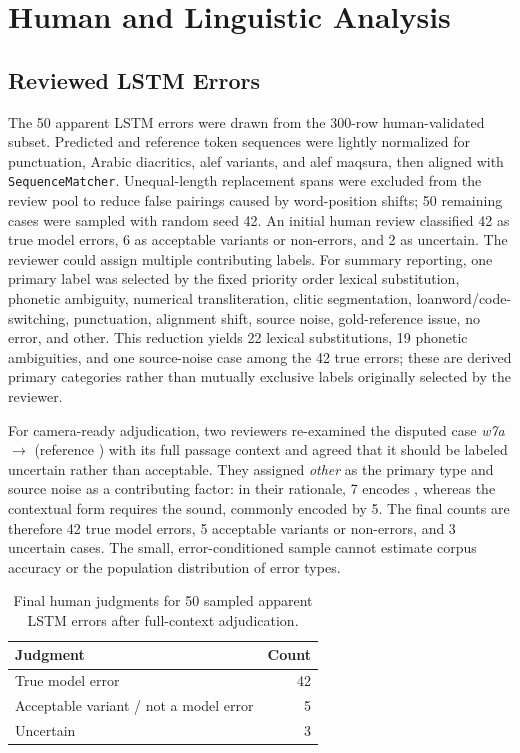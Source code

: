 \documentclass[runningheads]{llncs}
\newcommand{\textarabic}[1]{\textRL{\foreignlanguage{arabic}{#1}}}
\begin{document}
\section{Human and Linguistic Analysis}

\subsection{Reviewed LSTM Errors}

The 50 apparent LSTM errors were drawn from the 300-row human-validated subset. Predicted and reference token sequences were lightly normalized for punctuation, Arabic diacritics, alef variants, and alef maqsura, then aligned with \texttt{SequenceMatcher}. Unequal-length replacement spans were excluded from the review pool to reduce false pairings caused by word-position shifts; 50 remaining cases were sampled with random seed 42. An initial human review classified 42 as true model errors, 6 as acceptable variants or non-errors, and 2 as uncertain. The reviewer could assign multiple contributing labels. For summary reporting, one primary label was selected by the fixed priority order lexical substitution, phonetic ambiguity, numerical transliteration, clitic segmentation, loanword/code-switching, punctuation, alignment shift, source noise, gold-reference issue, no error, and other. This reduction yields 22 lexical substitutions, 19 phonetic ambiguities, and one source-noise case among the 42 true errors; these are derived primary categories rather than mutually exclusive labels originally selected by the reviewer.

For camera-ready adjudication, two reviewers re-examined the disputed case \textit{w7a} $\rightarrow$ \textarabic{والحال} (reference \textarabic{واخا}) with its full passage context and agreed that it should be labeled uncertain rather than acceptable. They assigned \textit{other} as the primary type and source noise as a contributing factor: in their rationale, 7 encodes \textarabic{ح}, whereas the contextual form requires the \textarabic{خ} sound, commonly encoded by 5. The final counts are therefore 42 true model errors, 5 acceptable variants or non-errors, and 3 uncertain cases. The small, error-conditioned sample cannot estimate corpus accuracy or the population distribution of error types.

\begin{table}[H]
\centering
\caption{Final human judgments for 50 sampled apparent LSTM errors after full-context adjudication.}
\label{tab:human-errors}
\small
\begin{tabular}{lr}
\toprule
\textbf{Judgment} & \textbf{Count} \\
\midrule
True model error & 42 \\
Acceptable variant / not a model error & 5 \\
Uncertain & 3 \\
\bottomrule
\end{tabular}
\end{table}
\end{document}
